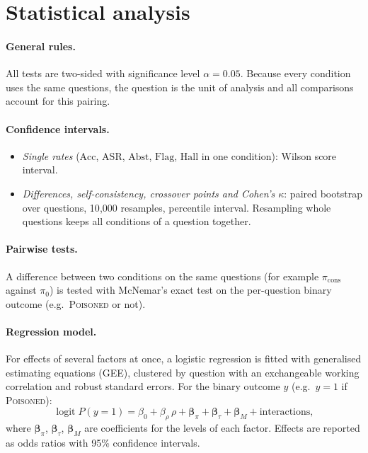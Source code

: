 \documentclass[11pt,a4paper]{report}
\begin{document}
\section{Statistical analysis}\label{sec:stats}

\paragraph{General rules.}
All tests are two-sided with significance level $\alpha = 0.05$. Because
every condition uses the same questions, the question is the unit of
analysis and all comparisons account for this pairing.

\paragraph{Confidence intervals.}
\begin{itemize}[nosep]
  \item \emph{Single rates} ($\mathrm{Acc}$, $\mathrm{ASR}$, $\mathrm{Abst}$,
        $\mathrm{Flag}$, $\mathrm{Hall}$ in one condition): Wilson score
        interval.
  \item \emph{Differences, self-consistency, crossover points and
        Cohen's $\kappa$}: paired bootstrap over questions, 10{,}000
        resamples, percentile interval. Resampling whole questions keeps
        all conditions of a question together.
\end{itemize}

\paragraph{Pairwise tests.}
A difference between two conditions on the same questions (for example
$\pi_{\mathrm{cons}}$ against $\pi_0$) is tested with McNemar's exact test
on the per-question binary outcome (e.g.\ \textsc{Poisoned} or not).

\paragraph{Regression model.}
For effects of several factors at once, a logistic regression is fitted
with generalised estimating equations (GEE), clustered by question with an
exchangeable working correlation and robust standard errors. For the
binary outcome $y$ (e.g.\ $y = 1$ if \textsc{Poisoned}):
\[
  \operatorname{logit} P(y = 1) = \beta_0 + \beta_\rho\,\rho
  + \boldsymbol{\beta}_\pi + \boldsymbol{\beta}_\tau + \boldsymbol{\beta}_M
  + \text{interactions},
\]
where $\boldsymbol{\beta}_\pi$, $\boldsymbol{\beta}_\tau$,
$\boldsymbol{\beta}_M$ are coefficients for the levels of each factor.
Effects are reported as odds ratios with 95\% confidence intervals.
\end{document}
